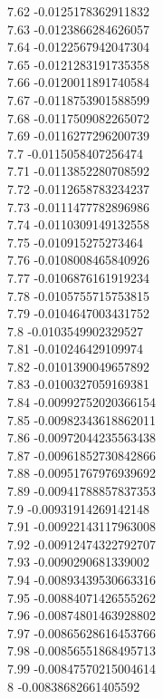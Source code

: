 {7.62	-0.0125178362911832\\
7.63	-0.0123866284626057\\
7.64	-0.0122567942047304\\
7.65	-0.0121283191735358\\
7.66	-0.0120011891740584\\
7.67	-0.0118753901588599\\
7.68	-0.0117509082265072\\
7.69	-0.0116277296200739\\
7.7	-0.0115058407256474\\
7.71	-0.0113852280708592\\
7.72	-0.0112658783234237\\
7.73	-0.0111477782896986\\
7.74	-0.0110309149132558\\
7.75	-0.010915275273464\\
7.76	-0.0108008465840926\\
7.77	-0.0106876161919234\\
7.78	-0.0105755715753815\\
7.79	-0.0104647003431752\\
7.8	-0.0103549902329527\\
7.81	-0.010246429109974\\
7.82	-0.0101390049657892\\
7.83	-0.0100327059169381\\
7.84	-0.00992752020366154\\
7.85	-0.00982343618862011\\
7.86	-0.00972044235563438\\
7.87	-0.00961852730842866\\
7.88	-0.00951767976939692\\
7.89	-0.00941788857837353\\
7.9	-0.00931914269142148\\
7.91	-0.00922143117963008\\
7.92	-0.00912474322792707\\
7.93	-0.0090290681339002\\
7.94	-0.00893439530663316\\
7.95	-0.00884071426555262\\
7.96	-0.00874801463928802\\
7.97	-0.00865628616453766\\
7.98	-0.00856551868495713\\
7.99	-0.00847570215004614\\
8	-0.00838682661405592\\
}
